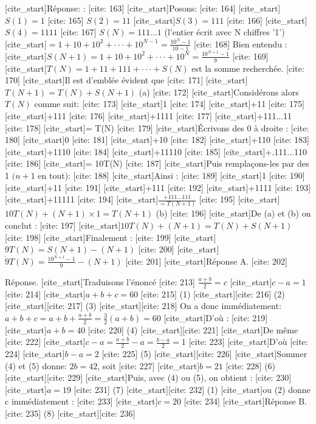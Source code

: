 [cite_start]Réponse: : [cite: 163]
[cite_start]Posons: [cite: 164]
[cite_start]$S(1)=1$ [cite: 165]
$S(2)=11$
[cite_start]$S(3)=111$ [cite: 166]
[cite_start]$S(4)=1111$ [cite: 167]
$S(N)=111...1$ (l'entier écrit avec N chiffres '1')
[cite_start]$=1+10+10^{2}+\cdot\cdot\cdot+10^{N-1}=\frac{10^{N}-1}{10-1}$ [cite: 168]
Bien entendu :
[cite_start]$S(N+1)=1+10+10^{2}+\cdot\cdot\cdot+10^{N}=\frac{10^{N+1}-1}{9}$ [cite: 169]
[cite_start]$T(N)=1+11+111+\cdot\cdot\cdot+S(N)$ est la somme recherchée. [cite: 170]
[cite_start]Il est d'emblée évident que [cite: 171]
[cite_start]$T(N+1)=T(N)+S(N+1)$ (a) [cite: 172]
[cite_start]Considérons alors $T(N)$ comme suit: [cite: 173]
[cite_start]1 [cite: 174]
[cite_start]+11 [cite: 175]
[cite_start]+111 [cite: 176]
[cite_start]+1111 [cite: 177]
[cite_start]+111...11 [cite: 178]
[cite_start]= T(N) [cite: 179]
[cite_start]Écrivons des 0 à droite : [cite: 180]
[cite_start]0 [cite: 181]
[cite_start]+10 [cite: 182]
[cite_start]+110 [cite: 183]
[cite_start]+1110 [cite: 184]
[cite_start]+11110 [cite: 185]
[cite_start]+.111...110 [cite: 186]
[cite_start]= 10T(N) [cite: 187]
[cite_start]Puis remplaçons-les par des 1 $(n+1$ en tout): [cite: 188]
[cite_start]Ainsi : [cite: 189]
[cite_start]1 [cite: 190]
[cite_start]+11 [cite: 191]
[cite_start]+111 [cite: 192]
[cite_start]+1111 [cite: 193]
[cite_start]+11111 [cite: 194]
[cite_start]$\frac{+111...111}{=T(N+1)}$ [cite: 195]
[cite_start]$10T(N)+(N+1)\times1=T(N+1)$ (b) [cite: 196]
[cite_start]De (a) et (b) on conclut : [cite: 197]
[cite_start]$10T(N)+(N+1)=T(N)+S(N+1)$ [cite: 198]
[cite_start]Finalement : [cite: 199]
[cite_start]$9T(N)=S(N+1)-(N+1)$ [cite: 200]
[cite_start]$\dot{9}T(N)=\frac{10^{N+1}-1}{9}-(N+1)$ [cite: 201]
[cite_start]Réponse A. [cite: 202]

Réponse. [cite_start]Traduisons l'énoncé [cite: 213]
$\frac{a+b}{2}=c$
[cite_start]$c-a=1$ [cite: 214]
[cite_start]$a+b+c=60$ [cite: 215]
(1) [cite_start][cite: 216]
(2) [cite_start][cite: 217]
(3) [cite_start][cite: 218]
On a donc immédiatement: $a+b+c=a+b+\frac{a+b}{2}=\frac{3}{2}(a+b)=60$
[cite_start]D'où : [cite: 219]
[cite_start]$a+b=40$ [cite: 220]
(4) [cite_start][cite: 221]
[cite_start]De même [cite: 222]
[cite_start]$c-a=\frac{a+b}{2}-a=\frac{b-a}{2}=1$ [cite: 223]
[cite_start]D'où [cite: 224]
[cite_start]$b-a=2$ [cite: 225]
(5) [cite_start][cite: 226]
[cite_start]Sommer (4) et (5) donne: $2b=42$, soit [cite: 227]
[cite_start]$b=21$ [cite: 228]
(6) [cite_start][cite: 229]
[cite_start]Puis, avec (4) ou (5), on obtient : [cite: 230]
[cite_start]$a=19$ [cite: 231]
(7) [cite_start][cite: 232]
(1) [cite_start]ou (2) donne c immédiatement : [cite: 233]
[cite_start]$c=20$ [cite: 234]
[cite_start]Réponse B. [cite: 235]
(8) [cite_start][cite: 236]

